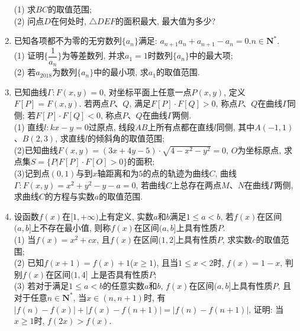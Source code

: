 \documentclass[10pt,a4paper]{article}
\begin{document}
\begin{enumerate}[1.]
\begin{center}
\begin{tikzpicture}
    \end{tikzpicture}
\end{center}
(1) 求$BC$的取值范围;\\
(2) 问点$D$在何处时, $\triangle DEF$的面积最大, 最大值为多少?
\item 已知各项都不为零的无穷数列$\{a_n\}$满足: ${a_{n+1}}a_n+{a_{n+1}}-a_n=0$.$n\in \mathbf{N}^*$.\\
(1) 证明$\{\dfrac 1{a_n}\}$为等差数列, 并求$a_1=1$时数列$\{a_n\}$中的最大项;\\
(2) 若$a_{2018}$为数列$\{a_n\}$中的最小项, 求$a_1$的取值范围.
\item 已知曲线$\Gamma:F(x,y)=0$, 对坐标平面上任意一点$P(x,y)$, 定义$F[P]=F(x,y)$. 若两点$P$、$Q$, 满足$F[P]\cdot F[Q]>0$, 称点$P$、$Q$在曲线$\Gamma$同侧; 若$F[P]\cdot F[Q]<0$, 称点$P$、$Q$在曲线$\Gamma$两侧.\\
(1) 直线$l:kx-y=0$过原点, 线段$AB$上所有点都在直线$l$同侧, 其中$A(-1,1)$、$B(2,3)$, 求直线$l$的倾斜角的取值范围;\\
(2)已知曲线$F(x,y)=(3x+4y-5)\cdot \sqrt{4-x^2-y^2}=0$, $O$为坐标原点, 求点集$S=\{P|F[P]\cdot F[O]>0\}$的面积;\\
(3)记到点$(0,1)$与到$x$轴距离和为$5$的点的轨迹为曲线$C$, 曲线$\Gamma :F(x,y)=x^2+y^2-y-a=0$, 若曲线$C$上总存在两点$M$、$N$在曲线$\Gamma$两侧, 求曲线$C$的方程与实数$a$的取值范围.
\item 设函数$f(x)$在$[1,+\infty)$上有定义, 实数$a$和$b$满足$1\le a<b$, 若$f(x)$在区间$(a,b]$上不存在最小值, 则称$f(x)$在区间$(a,b]$上具有性质$P$.\\
(1) 当$f(x)=x^2+cx$, 且$f(x)$在区间$(1,2]$上具有性质$P$, 求实数$c$的取值范围;\\
(2) 已知$f(x+1)=f(x)+1$($x\ge 1$), 且当$1\le x<2$时, $f(x)=1-x$, 判别$f(x)$在区间$(1,4]$ 上是否具有性质$P$;\\
(3) 若对于满足$1\le a<b$的任意实数$a$和$b$, $f(x)$在区间$(a,b]$上具有性质$P$, 且对于任意$n\in \mathbf{N}^*$, 当$x\in (n,n+1)$时, 有$|f(n)-f(x)|+|f(x)-f(n+1)|=|f(n)-f(n+1)|$, 证明: 当$x\ge 1$时, $f(2x)>f(x)$.



\end{enumerate}
\end{document}
